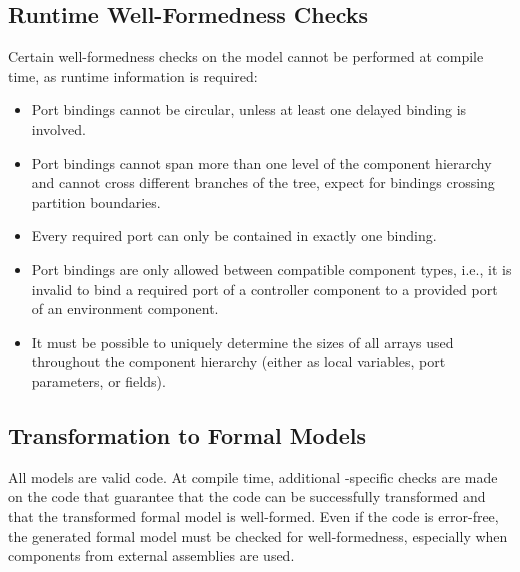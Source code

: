 \documentclass[a4paper,10pt,english]{article}
\begin{document}
\subsection{Runtime Well-Formedness Checks}
Certain well-formedness checks on the \SSharp model cannot be performed at compile time, as runtime information is required:
\begin{itemize}
	\item Port bindings cannot be circular, unless at least one delayed binding is involved.
	\item Port bindings cannot span more than one level of the component hierarchy and cannot cross different branches of the tree,
	expect for bindings crossing partition boundaries.
	\item Every required port can only be contained in exactly one binding.
	\item Port bindings are only allowed between compatible component types, i.e., it is invalid to bind a required port of a
	controller component to a provided port of an environment component.
	\item It must be possible to uniquely determine the sizes of all arrays used throughout the component hierarchy (either as local
	variables, port parameters, or fields).
\end{itemize}

\subsection{Transformation to Formal Models}
All \SSharp models are valid \CSharp code. At compile time, additional \SSharp-specific checks are made on the
\CSharp code that guarantee that the code can be successfully transformed and that the transformed formal model is well-formed.
Even if the \CSharp code is error-free, the generated formal model must be checked for well-formedness, especially when components
from external \SSharp assemblies are used.
\end{document}
